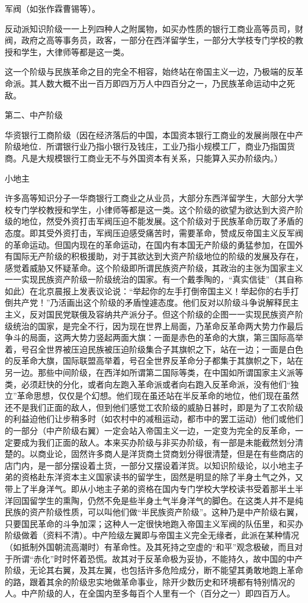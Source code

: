 军阀（如张作霖曹锡等）。

反动派知识阶级一一上列四种人之附属物，如买办性质的银行工商业高等员司，财阀，政府之高等事务员，政客，一部分在西洋留学生，一部分大学枝专门学校的教授和学生，大律师等都是这一类。

这一个阶级与民族革命之目的完全不相容，始终站在帝国主义一边，乃极端的反革命派。其人数大概不出一百万即四万万人中四百分之一，乃民族革命运动中之死敌。

第二、中产阶级

华资银行工商阶级（因在经济落后的中国，本国资本银行工商业的发展尚限在中产阶级地位．所谓银行业乃指小银行及钱庄，工业乃指小规模工厂，商业乃指国货商。凡是大规模银行工商业无不与外国资本有关系，只能算入买办阶级内。）

小地主

许多高等知识分子一华商银行工商业之从业员，大部分东西洋留学生，大部分大学校专门学校教授和学生，小律师等都是这一类。这个阶级的欲望为欲达到大资产阶级的地位，然受外资打击军阀压迫不能发展。这个阶级对于民族革命历取了矛盾的态度。即其受外资打击，军阀压迫感受痛苦时，需要革命，赞成反帝国主义反军阀的革命运动。但国内现在的革命运动，在国内有本国无产阶级的勇猛参加，在国外有国际无产阶级的积极援助，对于其欲达到大资产阶级地位的阶级的发展及存在，感觉着威胁又怀疑革命。这个阶级即所谓民族资产阶级，其政治的主张为国家主义一一实现民族资产阶级一阶级统治的国家。有一个戴季陶的，“真实信徒”（其自称如此）在北京晨报上发表议论说：“举起你的左手打倒帝国主义！举起你的右手打倒共产党！”乃活画出这个阶级的矛盾惶遽态度。他们反对以阶级斗争说解释民主主义，反对国民党联俄及容纳共产派分子。但这个阶级的企图一一实现民族资产阶级统治的国家，是完全不行，因为现在世界上局面，乃革命反革命两大势力作最后争斗的局面，这两大势力竖起两面大旗：一面是赤色的革命的大旗，第三国际高举着，号召全世界被压迫民族被压迫阶级集合子其旗帜之下，站在一边；一面是白色的反革命大旗，国际联盟高举着，号召全世界反革命分子都集于其旗帜之下，站在另一边。那些中间阶级，在西洋如所谓第二国际等类，在中国如所谓国家主义派等类，必须赶快的分化，或者向左跑入革命派或者向右跑入反革命派，没有他们“独立”革命思想，仅仅是个幻想。他们现在虽还站在半反革命的地位，他们现在虽然还不是我们正面的敌人，但到他们感觉工农阶级的威胁日甚时，即是为了工农阶级的利益迫他们让步稍多时（如农村中的减租运动，都市中的罢工运动）他们或他们的一部分（中产阶级右翼）一定会站入帝国主义一边，一定变为完全的反革命，一定要成为我们正面的敌人。本来买办阶级与非买办阶级，有一部是未能截然划分清楚的。以商业论，固然许多商人是洋货商土贷商划分得很清楚，但是在有些商店的店门内，是一部分摆设着土货，一部分又摆设着洋货。以知识阶级论，以小地主子弟的资格赴东洋资本主义国家读书的留学生，固然是明显的除了半身土气之外，又带上了半身洋气。即从小地主子弟的资格在国内专门学校大学校读书受着那半土半洋回国留学生的熏陶，仍然不免是些半身土气半身洋气的脚色。在这类人并不是纯民族的资产阶级性质，可以叫他们做“半民族资产阶级”。这种乃是中产阶级右翼，只要国民革命的斗争加深；这种人一定很快地跑入帝国主义军阀的队伍里，和买办阶级做着（资料不清）。中产险级左翼即与帝国主义完全无缘者，此派在某种情况（如抵制外国朝流高潮时）有革命性。及其死持之空虚的“和平”观念极破，而且对于所谓“赤化”时时怀着恐慌。故其对于反革命极为妥协，不能持久，故中国的中产阶级，无论其右翼，及其左翼，也包括许多危险成分，断不能望其勇敢地跑上革命的路，跟着其余的阶级忠实地做革命事业，除开少数历史和环境都有特别情况的人。中产阶级的人，在全国内至多每百个人里有一个（百分之一）即四百万人。


